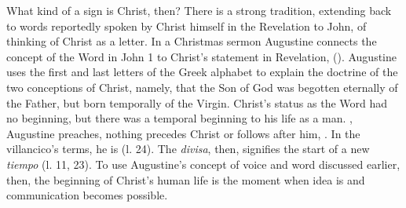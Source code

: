 What kind of a sign is Christ, then?
There is a strong tradition, extending back to words reportedly spoken by Christ
himself in the Revelation to John, of thinking of Christ as a letter.
In a Christmas sermon Augustine connects the concept of the Word in John 1 to
Christ's statement in Revelation,  ().
Augustine uses the first and last letters of the Greek alphabet to explain the
doctrine of the two conceptions of Christ, namely, that the Son of God was
begotten eternally of the Father, but born temporally of the Virgin.
Christ's status as the Word had no beginning, but there was a temporal beginning
to his life as a man.
, Augustine preaches,
nothing precedes Christ or follows after him, .%
    \Autocites
    [, 118r, In Natali Domini 2]
    {Augustine:Opera1555}
    [on Rv 1]{Lapide:Apocalypse1627}
In the villancico's terms, he is  (l. 24).
The \emph{divisa}, then, signifies the start of a new \emph{tiempo} (l.  11,
23).
To use Augustine's concept of voice and word discussed earlier, then, the
beginning of Christ's human life is the moment when idea is  and communication becomes possible.

